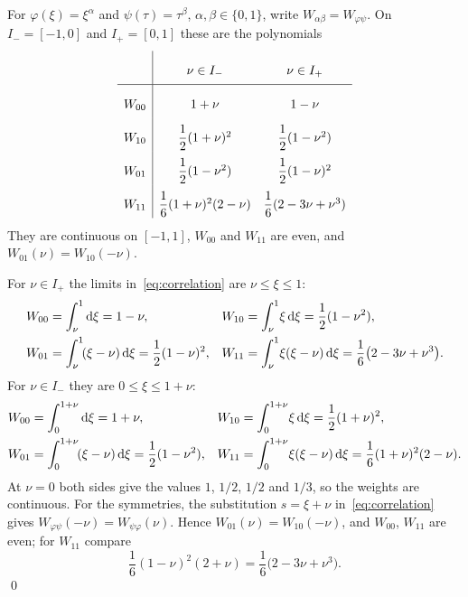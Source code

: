  For $\varphi(\xi)=\xi^\alpha$ and $\psi(\tau)=\tau^\beta$,
$\alpha,\beta\in\{0,1\}$, write $W_{\alpha\beta}=W_{\varphi\psi}$. On $I_-=[-1,0]$ and $I_+=[0,1]$ these are the
polynomials
\begin{equation}
    \label{eq:weights}
    \renewcommand{\arraystretch}{2.2}
    \begin{array}{l|cc}
                 & \nu\in I_-                         & \nu\in I_+ \\ \hline
        W_{00}   & 1+\nu                              & 1-\nu \\
        W_{10}   & \dfrac12(1+\nu)^2                 & \dfrac12(1-\nu^2) \\
        W_{01}   & \dfrac12(1-\nu^2)                 & \dfrac12(1-\nu)^2 \\
        W_{11}   & \dfrac16(1+\nu)^2(2-\nu)          & \dfrac16(2-3\nu+\nu^3)
    \end{array}
\end{equation}
They are continuous on $[-1,1]$, $W_{00}$ and $W_{11}$ are even, and $W_{01}(\nu)=W_{10}(-\nu)$.

\vspace{\baselineskip}
\proof For $\nu\in I_+$ the limits in~\eqref{eq:correlation} are $\nu\le\xi\le1$:
\begin{equation}
    \begin{aligned}
    W_{00} &= \int_\nu^1\!\,\mathrm{d}\xi = 1-\nu, &
    W_{10} &= \int_\nu^1\!\xi\,\mathrm{d}\xi = \frac12(1-\nu^2),\\
    W_{01} &= \int_\nu^1\!(\xi-\nu)\,\mathrm{d}\xi = \frac12(1-\nu)^2, &
    W_{11} &= \int_\nu^1\!\xi(\xi-\nu)\,\mathrm{d}\xi = \frac16\bigl(2-3\nu+\nu^3\bigr).
    \end{aligned}
\end{equation}
For $\nu\in I_-$ they are $0\le\xi\le1+\nu$:
\begin{equation}
    \begin{aligned}
    W_{00} &= \int_0^{1+\nu}\!\,\mathrm{d}\xi = 1+\nu, &
    W_{10} &= \int_0^{1+\nu}\!\xi\,\mathrm{d}\xi = \frac12(1+\nu)^2,\\
    W_{01} &= \int_0^{1+\nu}\!(\xi-\nu)\,\mathrm{d}\xi = \frac12(1-\nu^2), &
    W_{11} &= \int_0^{1+\nu}\!\xi(\xi-\nu)\,\mathrm{d}\xi = \frac16(1+\nu)^2(2-\nu).
    \end{aligned}
\end{equation}
At $\nu=0$ both sides give the values $1$, $1/2$, $1/2$ and $1/3$, so the weights are continuous. For the symmetries,
the substitution $s=\xi+\nu$ in~\eqref{eq:correlation} gives $W_{\varphi\psi}(-\nu)=W_{\psi\varphi}(\nu)$. Hence
$W_{01}(\nu)=W_{10}(-\nu)$, and $W_{00}$, $W_{11}$ are even; for $W_{11}$ compare
\begin{equation}
    \frac16(1-\nu)^2(2+\nu)=\frac16\bigl(2-3\nu+\nu^3\bigr).
\end{equation}
\qed

